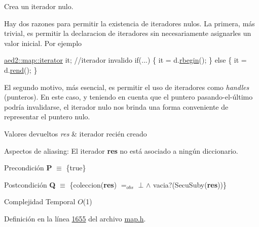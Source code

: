 Crea un iterador nulo. 

Hay dos razones para permitir la existencia de iteradores nulos. La primera, más trivial, es permitir la declaracion de iteradores sin necesariamente asignarles un valor inicial. Por ejemplo 
\begin{DoxyCode}
\hyperlink{classaed2_1_1map_1_1iterator}{aed2::map::iterator} it;   \textcolor{comment}{//iterador invalido}
\textcolor{keywordflow}{if}(...) \{
  it = d.\hyperlink{classaed2_1_1map_ac412d3902112122c1bffe2d4283a4e9d_ac412d3902112122c1bffe2d4283a4e9d}{rbegin}();
\} \textcolor{keywordflow}{else} \{
  it = d.\hyperlink{classaed2_1_1map_a277f03b4f4b6b98879e4e4921081801f_a277f03b4f4b6b98879e4e4921081801f}{rend}();
\}
\end{DoxyCode}
 El segundo motivo, más esencial, es permitir el uso de iteradores como {\itshape handles} (punteros). En este caso, y teniendo en cuenta que el puntero pasando-\/el-\/último podría invalidarse, el iterador nulo nos brinda una forma conveniente de representar el puntero nulo.


\begin{DoxyRetVals}{Valores devueltos}
{\em res} & iterador recién creado\\
\hline
\end{DoxyRetVals}
\begin{DoxyParagraph}{Aspectos de aliasing\+:}
El iterador {\bfseries res} no está asociado a ningún diccionario.
\end{DoxyParagraph}
\begin{DoxyPrecond}{Precondición}
{\bfseries P} $\equiv$ \{true\} 
\end{DoxyPrecond}
\begin{DoxyPostcond}{Postcondición}
{\bfseries Q} $\equiv$ \{coleccion({\bfseries res}) $=_{obs}$ $\bot$ $\land$ vacia?(Secu\+Suby({\bfseries res}))\}
\end{DoxyPostcond}

\begin{DoxyDescription}
\item[Complejidad Temporal]$O$(1)
\end{DoxyDescription}

Definición en la línea \hyperlink{map_8h_source_l01655}{1655} del archivo \hyperlink{map_8h_source}{map.\+h}.

\mbox{\label{classaed2_1_1map_1_1iterator_ab0ea21abcb32b6d5a72cf341b9029838_ab0ea21abcb32b6d5a72cf341b9029838}} 
